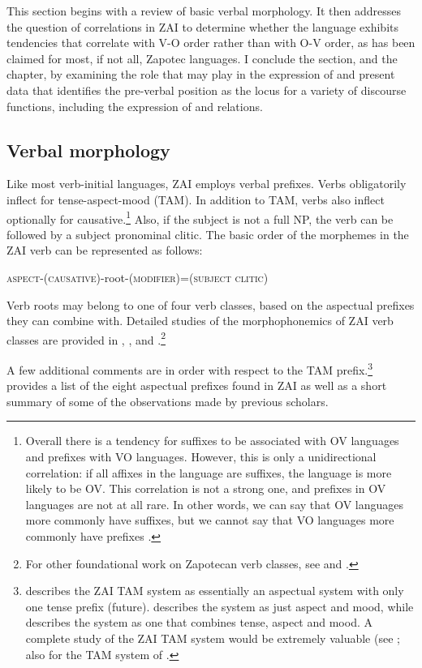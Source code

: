 This section begins with a review of basic verbal morphology. It then addresses the question of  correlations in ZAI to determine whether the language exhibits tendencies that correlate with V-O order rather than with O-V order, as has been claimed for most, if not all, Zapotec languages. I conclude the section, and the chapter, by examining the role that  may play in the expression of  and present data that identifies the pre-verbal position as the locus for a variety of discourse functions, including the expression of  and  relations. 



\subsection{Verbal morphology}\label{verbalmorphology}

Like most verb-initial languages, ZAI employs verbal prefixes. Verbs obligatorily inflect for tense-aspect-mood (TAM). In addition to TAM, verbs also inflect optionally for causative.\footnote{Overall there is a tendency for suffixes to be associated with OV languages and prefixes with VO languages. However, this is only a unidirectional correlation: if all affixes in the language are suffixes, the language is more likely to be OV. This correlation is not a strong one, and prefixes in OV languages are not at all rare. In other words, we can say that OV languages more commonly have suffixes, but we cannot say that VO languages more commonly have prefixes \citep{dryer2007}.} Also, if the subject is not a full NP, the verb can be followed by a subject pronominal clitic. The basic order of the morphemes in the ZAI verb can be represented as follows:



\textsc{aspect}-\textsc{(causative)}-root-\textsc{(modifier)}=\textsc{(subject clitic)}



Verb roots may belong to one of four verb classes, based on the aspectual prefixes they can combine with. Detailed studies of the morphophonemics of ZAI verb classes are provided in \citet{marlett1987}, \citet{enriquez2008}, and \citet{perez2015}.\footnote{For other foundational work on Zapotecan verb classes, see \citet{smithstark2002} and \citet{campbell2011}.}

A few additional comments are in order with respect to the TAM prefix.\footnote{\citet{pickett1998} describes the ZAI TAM system as essentially an aspectual system with only one tense prefix (future). \citet{mock1990} describes the system as just aspect and mood, while \citet{suarez1983} describes the system as one that combines tense, aspect and mood. A complete study of the ZAI TAM system would be extremely valuable (see \citet{perez2015}; also \citet{sicoli2015} for the TAM system of  .}  provides a list of the eight aspectual prefixes found in ZAI as well as a short summary of some of the observations made by previous scholars.  

